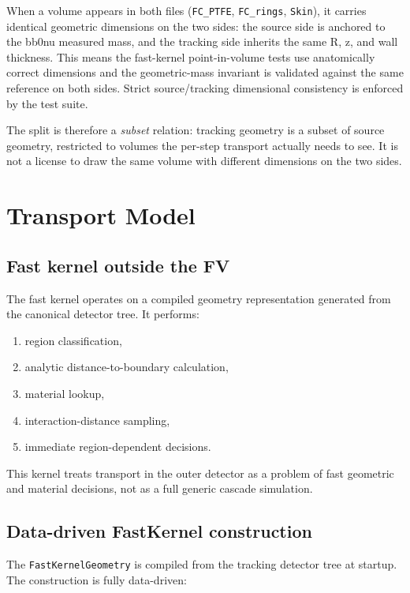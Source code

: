 \documentclass[11pt]{article}
\begin{document}
When a volume appears in both files (\texttt{FC\_PTFE}, \texttt{FC\_rings},
\texttt{Skin}), it carries identical geometric dimensions on the two sides:
the source side is anchored to the bb0nu measured mass, and the tracking side
inherits the same R, z, and wall thickness. This means the fast-kernel
point-in-volume tests use anatomically correct dimensions and the
geometric-mass invariant is validated against the same reference on both
sides. Strict source/tracking dimensional consistency is enforced by the test
suite.

The split is therefore a \emph{subset} relation: tracking geometry is a subset
of source geometry, restricted to volumes the per-step transport actually
needs to see. It is not a license to draw the same volume with different
dimensions on the two sides.

\section{Transport Model}

\subsection{Fast kernel outside the FV}

The fast kernel operates on a compiled geometry representation generated from the
canonical detector tree. It performs:

\begin{enumerate}[label=\arabic*.]
\item region classification,
\item analytic distance-to-boundary calculation,
\item material lookup,
\item interaction-distance sampling,
\item immediate region-dependent decisions.
\end{enumerate}

This kernel treats transport in the outer detector as a problem of fast
geometric and material decisions, not as a full generic cascade simulation.

\subsection{Data-driven FastKernel construction}

The \texttt{FastKernelGeometry} is compiled from the tracking detector tree at
startup. The construction is fully data-driven:
\end{document}
